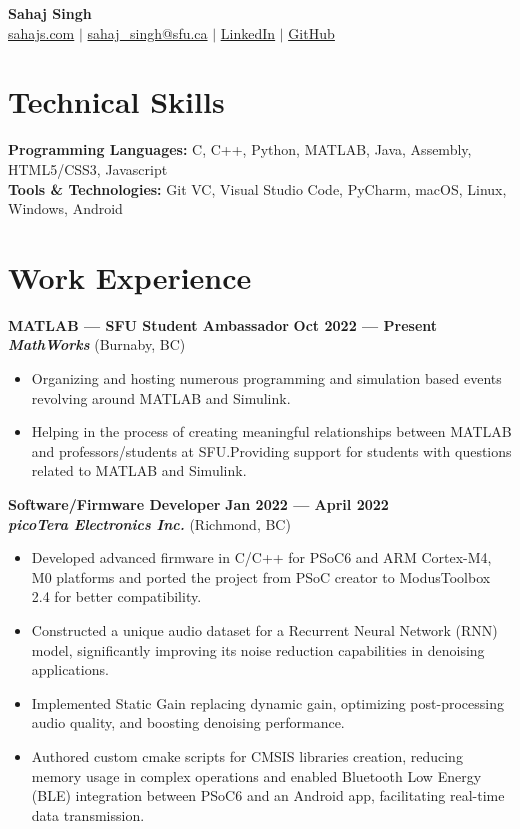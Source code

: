 \documentclass[letterpaper,11pt]{article}
\newcommand{\contact} [5] {
    \begin{center}
        \textbf{\Huge #1} \\ \vspace{1pt}
        \small \href{https://#2}{#2} $|$ \href{mailto:#3}{#3} $|$ 
        \href{#4}{\underline{LinkedIn}} $|$
        \href{#5}{\underline{GitHub}}
    \end{center}
}
\newcommand{\Item} [1] {
    \item\small{{#1 \vspace{-2pt}}}
}
\newcommand{\employer} [5] {
    {\textbf{#3} \hfill \textbf{#4 --- #5}\\ \textbf{\emph{#1}} (#2)\\}
}
\newcommand{\workItemListStart} [0] {
    \vspace{-1pt}
    \begin{itemize}[leftmargin=*,topsep=0pt,itemsep=-2pt]
}
\newcommand{\workItemListEnd} [0] {
    \end{itemize}
    \vspace{1pt}
}
\begin{document}
    \vspace*{-30pt}

    \contact{Sahaj Singh}{sahajs.com}{sahaj\_singh@sfu.ca}{https://www.linkedin.com/in/sahaj--singh/}{https://github.com/SatireSage}

    \section{Technical Skills}
    \begin{itemize}[leftmargin=0.15in, label={}]
    \small{\item{
        \textbf{Programming Languages:}{ C, C++, Python, MATLAB, Java, Assembly, HTML5/CSS3, Javascript} \\
        \textbf{Tools \& Technologies:}{ Git VC, Visual Studio Code, PyCharm, macOS, Linux, Windows, Android} \\
    }}
    \end{itemize}

    \section{Work Experience}
    \employer{MathWorks}{Burnaby, BC}{MATLAB --- SFU Student Ambassador}{Oct 2022}{Present}
    \workItemListStart{}
        \Item{Organizing and hosting numerous programming and simulation based events revolving around MATLAB and Simulink.}
        \Item{Helping in the process of creating meaningful relationships between MATLAB and professors/students at SFU.\@ Providing support for students with questions related to MATLAB and Simulink.}
    \workItemListEnd{}
    \employer{picoTera Electronics Inc.}{Richmond, BC}{Software/Firmware Developer}{Jan 2022}{April 2022}
    \workItemListStart{}
        \Item{Developed advanced firmware in C/C++ for PSoC6 and ARM Cortex-M4, M0 platforms and ported the project from PSoC creator to ModusToolbox 2.4 for better compatibility.}
        \Item{Constructed a unique audio dataset for a Recurrent Neural Network (RNN) model, significantly improving its noise reduction capabilities in denoising applications.}
        \Item{Implemented Static Gain replacing dynamic gain, optimizing post-processing audio quality, and boosting denoising performance.}
        \Item{Authored custom cmake scripts for CMSIS libraries creation, reducing memory usage in complex operations and enabled Bluetooth Low Energy (BLE) integration between PSoC6 and an Android app, facilitating real-time data transmission.}
    \workItemListEnd{}
\end{document}
